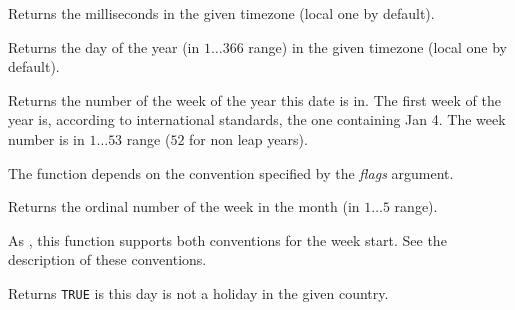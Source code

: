 \label{wxdatetimegetmillisecond}


Returns the milliseconds in the given timezone (local one by default).

\label{wxdatetimegetdayofyear}


Returns the day of the year (in $1\ldots366$ range) in the given timezone
(local one by default).

\label{wxdatetimegetweekofyear}


Returns the number of the week of the year this date is in. The first week of
the year is, according to international standards, the one containing Jan 4.
The week number is in $1\ldots53$ range ($52$ for non leap years).

The function depends on the  convention
specified by the {\it flags} argument.

\label{wxdatetimegetweekofmonth}


Returns the ordinal number of the week in the month (in $1\ldots5$  range).

As , this function supports
both conventions for the week start. See the description of these 
 conventions.

\label{wxdatetimeisworkday}


Returns {\tt TRUE} is this day is not a holiday in the given country.

\label{wxdatetimeisgregoriandate}


